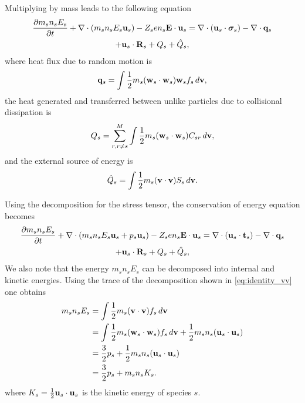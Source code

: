 \documentclass[a4paper,11pt]{report}
\begin{document}
Multiplying by mass leads to the following equation
\begin{multline}
\label{eq:energy_derv_5}
\frac{\partial m_s n_s E_s}{\partial t} + \nabla \cdot (m_s n_s E_s \mathbf{u}_s ) - Z_s e n_s \mathbf{E} \cdot \mathbf{u}_s = \nabla \cdot ( \mathbf{u}_s \cdot \boldsymbol{\sigma}_s ) - \nabla \cdot \mathbf{q}_s \\
+ \mathbf{u}_s \cdot \mathbf{R}_s + Q_{s} + \hat{Q}_s, 
\end{multline}
where heat flux due to random motion is
\begin{equation}
\mathbf{q}_s = \int \frac{1}{2} m_s (\mathbf{w}_s \cdot \mathbf{w}_s ) \mathbf{w}_s f_s \, d\mathbf{v},
\end{equation}
the heat generated and transferred between unlike particles due to collisional dissipation is 
\begin{equation}
Q_{s} = \sum_{r,r \ne s}^M \int \frac{1}{2} m_s (\mathbf{w}_s \cdot \mathbf{w}_s) C_{s r} \, d\mathbf{v},
\end{equation}
and the external source of energy is
\begin{equation}
\hat{Q}_s = \int \frac{1}{2} m_s (\mathbf{v} \cdot \mathbf{v}) S_s \, d\mathbf{v}.
\end{equation}

Using the decomposition for the stress tensor, the conservation of energy equation becomes
\begin{multline}
\label{eq:energy_derv_6}
\frac{\partial m_s n_s E_s}{\partial t} + \nabla \cdot (m_s n_s E_s \mathbf{u}_s + p_s \mathbf{u}_s ) - Z_s e n_s \mathbf{E} \cdot \mathbf{u}_s = \nabla \cdot ( \mathbf{u}_s \cdot \mathbf{t}_s ) - \nabla \cdot \mathbf{q}_s \\
+ \mathbf{u}_s \cdot \mathbf{R}_s + Q_{s} + \hat{Q}_s, 
\end{multline}
We also note that the energy $m_s n_s E_s$ can be decomposed into internal and kinetic energies. Using the trace of the decomposition shown in \cref{eq:identity_vv} one obtains
\begin{align}
m_s n_s E_s & = \int \frac{1}{2} m_s (\mathbf{v} \cdot \mathbf{v}) f_s \, d\mathbf{v} \nonumber \\
& = \int \frac{1}{2} m_s (\mathbf{w}_s \cdot \mathbf{w}_s) f_s \, d\mathbf{v} + \frac{1}{2} m_s n_s (\mathbf{u}_s \cdot \mathbf{u}_s) \nonumber \\
& = \frac{3}{2} p_s + \frac{1}{2} m_s n_s (\mathbf{u}_s \cdot \mathbf{u}_s) \nonumber \\
& = \frac{3}{2} p_s + m_s n_s K_s.
\end{align}
where $K_s = \frac{1}{2} \mathbf{u}_s \cdot \mathbf{u}_s$ is the kinetic energy of species $s$.
\end{document}
